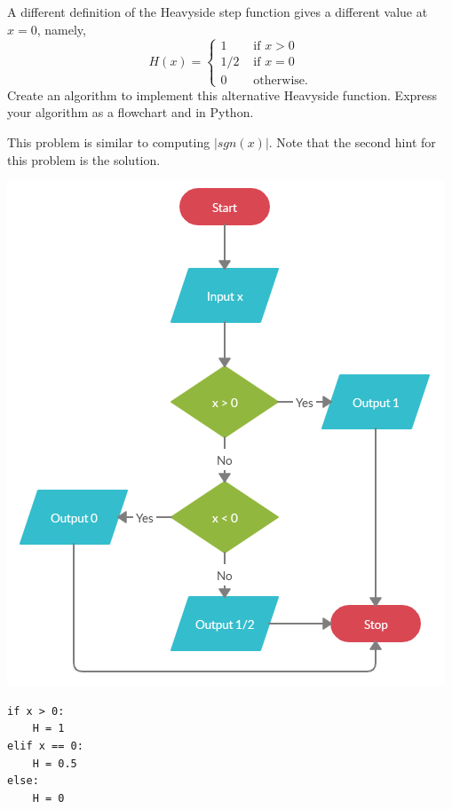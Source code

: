 \documentclass{ximera}
\begin{document}
\begin{question}
A different definition of the Heavyside step function gives a different value at $x=0$, namely,
	$$H(x)=\begin{cases} 1 &\text{ if $x>0$}\\
		1/2 &\text{ if $x=0$}\\
		0 &\text{ otherwise.}
	\end{cases}$$
Create an algorithm to implement this alternative Heavyside function. Express your algorithm as a flowchart and in Python.
	\begin{hint}
		This problem is similar to computing $|sgn(x)|$. Note that the second hint for this problem is the solution.
	\end{hint}
	\begin{hint}
	\begin{center}
		\includegraphics{heavy2.png}
	\end{center}
\begin{verbatim}
if x > 0:
	H = 1
elif x == 0:
	H = 0.5
else:
	H = 0
\end{verbatim}
	\end{hint}

\end{question}
\end{document}
